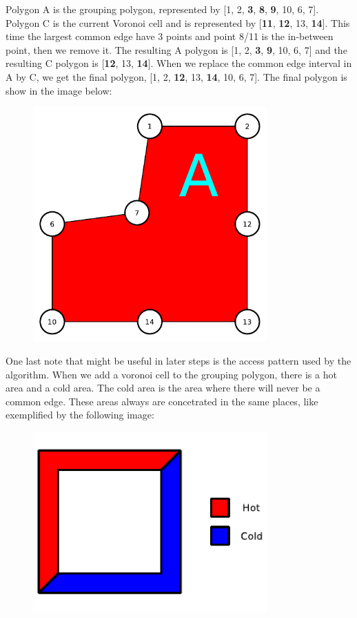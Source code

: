 Polygon A is the grouping polygon, represented by [1, 2, \textbf{3}, \textbf{8},
\textbf{9}, 10, 6, 7]. Polygon C is the current Voronoi cell and is represented
by [\textbf{11}, \textbf{12}, 13, \textbf{14}]. This time the largest common
edge have 3 points and point 8/11 is the in-between point, then we remove it.
The resulting A polygon is [1, 2, \textbf{3}, \textbf{9}, 10, 6, 7] and the
resulting C polygon is [\textbf{12}, 13, \textbf{14}]. When we replace the
common edge interval in A by C, we get the final polygon, [1, 2, \textbf{12},
13, \textbf{14}, 10, 6, 7]. The final polygon is show in the image below:

\begin{figure}[H]
  \centering
  \includegraphics[width=0.8\textwidth]{assets/polygon-union3.pdf}
\end{figure}

One last note that might be useful in later steps is the access pattern used by
the algorithm. When we add a voronoi cell to the grouping polygon, there is a
hot area and a cold area. The cold area is the area where there will never be a
common edge. These areas always are concetrated in the same places, like
exemplified by the following image:

\begin{figure}[H]
  \centering
  \includegraphics[width=0.8\textwidth]{assets/hot-cold.pdf}
\end{figure}

